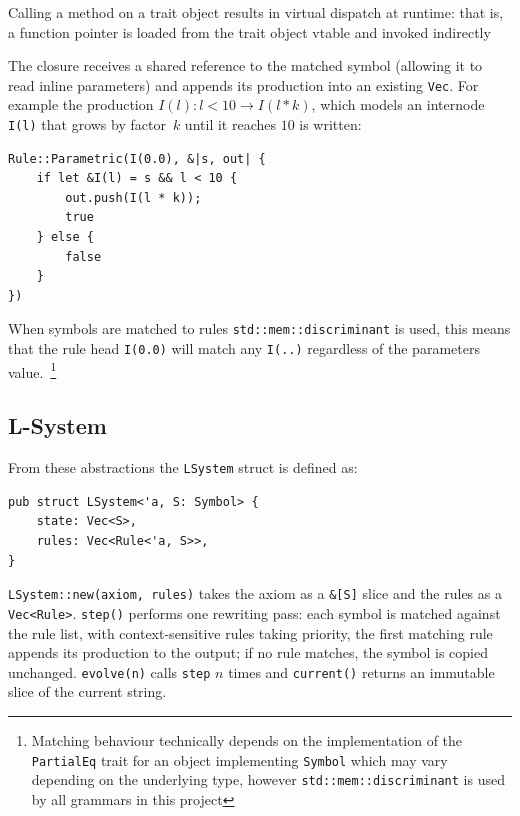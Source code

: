 \begin{displayquote}
  Calling a method on a trait object results in virtual dispatch at runtime: that is, a function pointer is
  loaded from the trait object vtable and invoked indirectly
\end{displayquote}

The closure receives a shared reference to the matched symbol (allowing it to read inline parameters) and
appends its production into an existing \texttt{Vec}. For example the production $I(l): l < 10 \rightarrow
I(l * k)$, which models an internode \texttt{I(l)} that grows by factor~$k$ until it reaches $10$ is written:

\begin{verbatim}
Rule::Parametric(I(0.0), &|s, out| {
    if let &I(l) = s && l < 10 {
        out.push(I(l * k));
        true
    } else {
        false
    }
})
\end{verbatim}

When symbols are matched to rules \texttt{std::mem::discriminant} is used, this means that the rule head
\texttt{I(0.0)} will match any \texttt{I(..)} regardless of the parameters value.~\footnote{Matching
  behaviour technically depends on the implementation of the \texttt{PartialEq} trait for an object
  implementing \texttt{Symbol} which may vary depending on the underlying type, however
\texttt{std::mem::discriminant} is used by all grammars in this project}

\subsection{L-System}

From these abstractions the \texttt{LSystem} struct is defined as:

\begin{verbatim}
pub struct LSystem<'a, S: Symbol> {
    state: Vec<S>,
    rules: Vec<Rule<'a, S>>,
}
\end{verbatim}

\texttt{LSystem::new(axiom, rules)} takes the axiom as a \texttt{\&[S]} slice and the rules as a
\texttt{Vec<Rule>}. \texttt{step()} performs one rewriting pass: each symbol is matched against the rule
list, with context-sensitive rules taking priority, the first matching rule appends its production to the
output; if no rule matches, the symbol is copied unchanged. \texttt{evolve(n)} calls \texttt{step} $n$ times
and \texttt{current()} returns an immutable slice of the current string.

